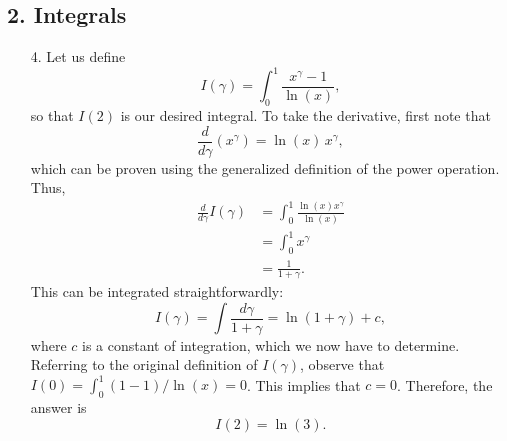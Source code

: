 \documentclass[10pt,a4paper]{article}
\begin{document}
\subsection*{2. Integrals}

\begin{enumerate}
\item[4.]
Let us define
\begin{equation}
  I(\gamma) = \int_0^1 \frac{x^\gamma - 1}{\ln(x)},
\end{equation}
so that $I(2)$ is our desired integral. To take the derivative, first
note that
\begin{equation}
  \frac{d}{d\gamma}(x^\gamma) = \ln(x)\,
  x^\gamma,
\end{equation}
which can be proven using the generalized definition of the power
operation. Thus,
\begin{align}
  \frac{d}{d\gamma} I(\gamma) &= \int_0^1 \frac{\ln(x) x^\gamma}{\ln(x)} \\
  &= \int_0^1 x^\gamma \\
  &= \frac{1}{1+\gamma}.
\end{align}
This can be integrated straightforwardly:
\begin{equation}
  I(\gamma) = \int \frac{d\gamma}{1+\gamma} = \ln(1+\gamma) + c,
\end{equation}
where $c$ is a constant of integration, which we now have to
determine.  Referring to the original definition of $I(\gamma)$,
observe that $I(0) = \int_0^1 (1 - 1)/\ln(x) = 0$. This implies that
$c = 0$.  Therefore, the answer is
\begin{equation}
  I(2) = \ln(3).
\end{equation}


\end{enumerate}
\end{document}
